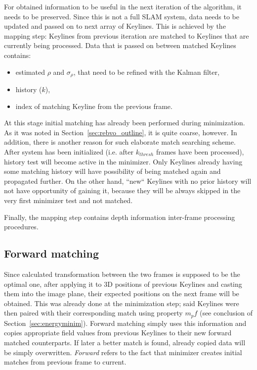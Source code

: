For obtained information to be useful in the next iteration of the algorithm, it needs to be preserved. Since this is not a full SLAM system, data needs to be updated and passed on to next array of Keylines. This is achieved by the mapping step: Keylines from previous iteration are matched to Keylines that are currently being processed. Data that is passed on between matched Keylines contains:

\begin{itemize}
	\item estimated $\rho$ and $\sigma_{\rho}$, that need to be refined with the Kalman filter,
	\item history ($k$),
	\item index of matching Keyline from the previous frame.
\end{itemize}

At this stage initial matching has already been performed during minimization. As it was noted in Section~\ref{sec:rebvo_outline}, it is quite coarse, however. In addition, there is another reason for such elaborate match searching scheme. After system has been initialized (i.e. after $k_{thresh}$ frames have been processed), history test will become active in the minimizer. Only Keylines already having some matching history will have possibility of being matched again and propagated further. On the other hand, ``new`` Keylines with no prior history will not have opportunity of gaining it, because they will be always skipped in the very first minimizer test and not matched.

Finally, the mapping step contains depth information inter-frame processing procedures.

\subsection{Forward matching}


Since calculated transformation between the two frames is supposed to be the optimal one, after applying it to 3D positions of previous Keylines and casting them into the image plane, their expected positions on the next frame will be obtained. This was already done at the minimization step; said Keylines were then paired with their corresponding match using property $m_pf$ (see conclusion of Section~\ref{sec:energyminim}). Forward matching simply uses this information and copies appropriate field values from previous Keylines to their new forward matched counterparts. If later a better match is found, already copied data will be simply overwritten. \textit{Forward} refers to the fact that minimizer creates initial matches from previous frame to current.

